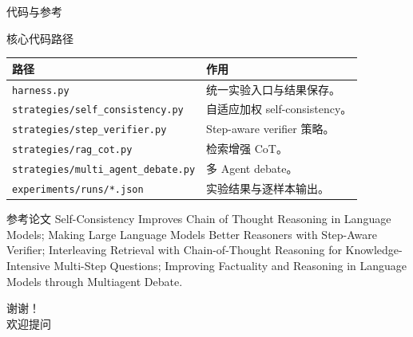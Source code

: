 \documentclass[10pt,aspectratio=169]{beamer}
\begin{document}
\begin{frame}{代码与参考}
  \begin{block}{核心代码路径}
    \small
    \begin{tabularx}{\linewidth}{lY}
      \toprule
      路径 & 作用 \\
      \midrule
      \texttt{harness.py} & 统一实验入口与结果保存。 \\
      \texttt{strategies/self\_consistency.py} & 自适应加权 self-consistency。 \\
      \texttt{strategies/step\_verifier.py} & Step-aware verifier 策略。 \\
      \texttt{strategies/rag\_cot.py} & 检索增强 CoT。 \\
      \texttt{strategies/multi\_agent\_debate.py} & 多 Agent debate。 \\
      \texttt{experiments/runs/*.json} & 实验结果与逐样本输出。 \\
      \bottomrule
    \end{tabularx}
  \end{block}
  \begin{block}{参考论文}
    \scriptsize
    Self-Consistency Improves Chain of Thought Reasoning in Language Models;
    Making Large Language Models Better Reasoners with Step-Aware Verifier;
    Interleaving Retrieval with Chain-of-Thought Reasoning for Knowledge-Intensive Multi-Step Questions;
    Improving Factuality and Reasoning in Language Models through Multiagent Debate.
  \end{block}
\end{frame}

\begin{frame}
  \centering
  \vspace{2.2cm}
  {\Huge 谢谢！}\\[0.8em]
  {\large 欢迎提问}
\end{frame}
\end{document}
